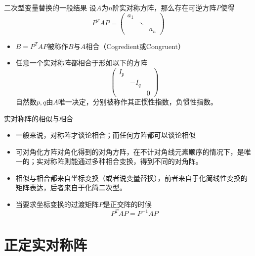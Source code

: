 \documentclass[10pt]{beamer}
\begin{document}

\begin{frame}

\begin{block}{二次型变量替换的一般结果}
设$A$为$n$阶实对称方阵，那么存在可逆方阵$P$使得
$$P^T A P = \begin{pmatrix} a_1 & & \\ & \ddots & \\ & & a_n \end{pmatrix}$$
\end{block}

\pause

\begin{itemize}
\item $B = P^TAP$被称作$B$与$A$相合（Cogredient或Congruent）
\item 任意一个实对称阵都相合于形如以下的方阵
$$\begin{pmatrix} I_p & & \\ & -I_q & \\ & & 0 \end{pmatrix}$$
自然数$p,q$由$A$唯一决定，分别被称作其正惯性指数，负惯性指数。
\end{itemize}

\end{frame}


\begin{frame}

\begin{block}{实对称阵的相似与相合}
\begin{itemize}
\item 一般来说，对称阵才谈论相合；而任何方阵都可以谈论相似
\item 可对角化方阵对角化得到的对角方阵，在不计对角线元素顺序的情况下，是唯一的；实对称阵则能通过多种相合变换，得到不同的对角阵。
\item 相似与相合都来自坐标变换（或者说变量替换），前者来自于化简线性变换的矩阵表达，后者来自于化简二次型。
\item 当要求坐标变换的过渡矩阵$P$是正交阵的时候
$$P^T A P = P^{-1}AP$$
\end{itemize}
\end{block}

\end{frame}


\section{正定实对称阵}
\end{document}
